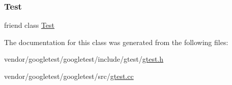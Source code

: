 \mbox{\label{classtesting_1_1_test_case_a5b78b1c2e1fa07ffed92da365593eaa4}} 
\subsubsection{\texorpdfstring{Test}{Test}}
{\footnotesize\ttfamily friend class \hyperlink{classtesting_1_1_test}{Test}\hspace{0.3cm}{\ttfamily [friend]}}



The documentation for this class was generated from the following files\+:\begin{DoxyCompactItemize}
\item 
vendor/googletest/googletest/include/gtest/\hyperlink{gtest_8h}{gtest.\+h}\item 
vendor/googletest/googletest/src/\hyperlink{gtest_8cc}{gtest.\+cc}\end{DoxyCompactItemize}
